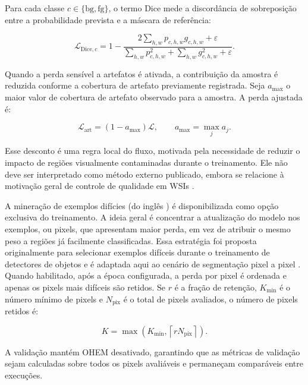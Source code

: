 Para cada classe $c \in \{\mathrm{bg},\mathrm{fg}\}$, o termo Dice mede a
discordância de sobreposição entre a probabilidade prevista e a máscara de
referência:

\begin{equation}
    \mathcal{L}_{\mathrm{Dice},c} =
    1 -
    \frac{
    2\sum_{h,w}p_{c,h,w}g_{c,h,w}+\varepsilon
    }{
    \sum_{h,w}p_{c,h,w}^2+\sum_{h,w}g_{c,h,w}^2+\varepsilon
    } .
    \label{eq:dice_loss}
\end{equation}

Quando a perda sensível a artefatos é ativada, a contribuição da amostra é
reduzida conforme a cobertura de artefato previamente registrada. Seja
$a_{\max}$ o maior valor de cobertura de artefato observado para a amostra. A
perda ajustada é:

\begin{equation}
    \mathcal{L}_{\mathrm{art}} =
    (1-a_{\max})\mathcal{L},
    \qquad
    a_{\max}=\max_j a_j .
    \label{eq:artifact_loss}
\end{equation}

Esse desconto é uma regra local do fluxo, motivada pela necessidade de reduzir o
impacto de regiões visualmente contaminadas durante o treinamento. Ele não deve
ser interpretado como método externo publicado, embora se relacione à motivação
geral de controle de qualidade em WSIs \cite{weng2024grandqc}.

A mineração de exemplos difícies (do inglês  ) é disponibilizada como opção exclusiva do
treinamento. A ideia geral é concentrar a atualização do modelo nos exemplos, ou
pixels, que apresentam maior perda, em vez de atribuir o mesmo peso a regiões já
facilmente classificadas. Essa estratégia foi proposta originalmente para
selecionar exemplos difíceis durante o treinamento de detectores de objetos e é
adaptada aqui ao cenário de segmentação pixel a pixel
\cite{shrivastava2016ohem}. Quando habilitado, após a época configurada, a perda
por pixel é ordenada e apenas os pixels mais difíceis são retidos. Se $r$ é a
fração de retenção, $K_{\min}$ é o número mínimo de pixels e $N_{\mathrm{pix}}$
é o total de pixels avaliados, o número de pixels retidos é:

\begin{equation}
    K =
    \max\left(K_{\min}, \left\lceil rN_{\mathrm{pix}}\right\rceil\right).
    \label{eq:ohem_k}
\end{equation}

A validação mantém OHEM desativado, garantindo que as métricas de validação sejam
calculadas sobre todos os pixels avaliáveis e permaneçam comparáveis entre
execuções.


